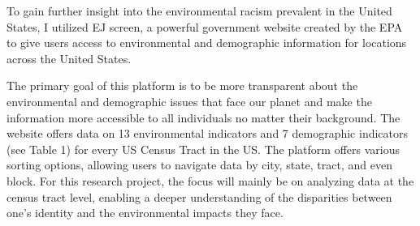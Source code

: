 \documentclass[letterpaper, 10 pt, conference]{ieeeconf}  %
\begin{document}
To gain further insight into the environmental racism prevalent in the United States, I utilized EJ screen\cite{EPA_2023c}, a powerful government website created by the EPA to give users access to environmental and demographic information for locations across the United States.\par
The primary goal of this platform is to be more transparent about the environmental and demographic issues that face our planet and make the information more accessible to all individuals no matter their background\cite{EPA_2023a}. The website offers data on 13 environmental indicators and 7 demographic indicators (see Table 1) for every US Census Tract in the US. The platform offers various sorting options, allowing users to navigate data by city, state, tract, and even block. For this research project, the focus will mainly be on analyzing data at the census tract level, enabling a deeper understanding of the disparities between one's identity and the environmental impacts they face.\par 
\end{document}
